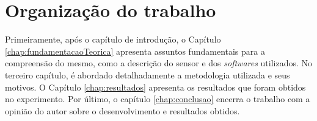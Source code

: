 \section{Organização do trabalho}
\label{sec:organizacaoTrabalho}

Primeiramente, após o capítulo de introdução, o Capítulo \ref{chap:fundamentacaoTeorica} apresenta assuntos fundamentais para a compreensão do mesmo, como a descrição do sensor e dos \textit{softwares} utilizados. No terceiro capítulo, é abordado detalhadamente a metodologia utilizada e seus motivos. O Capítulo \ref{chap:resultados} apresenta os resultados que foram obtidos no experimento. 
Por último, o capítulo \ref{chap:conclusao} encerra o trabalho com a opinião do autor sobre o desenvolvimento e resultados obtidos.